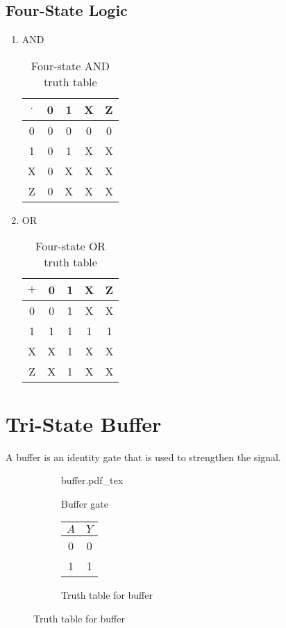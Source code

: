 \documentclass[oneside]{book}
\newcommand{\incfig}[1]{%
    {#1.pdf_tex}
}
\begin{document}
\subsection{Four-State Logic}
\begin{enumerate}
	\item AND
	      \begin{table}[ht]
		      \centering
		      \begin{tabular}{|c|cccc|}
			      \hline
			      $\cdot$ & 0 & 1 & X & Z \\
			      \hline
			      0       & 0 & 0 & 0 & 0 \\
			      1       & 0 & 1 & X & X \\
			      X       & 0 & X & X & X \\
			      Z       & 0 & X & X & X \\
			      \hline
		      \end{tabular}
		      \caption{Four-state AND truth table}
	      \end{table}
	\item OR
	      \begin{table}[ht]
		      \centering
		      \begin{tabular}{|c|cccc|}
			      \hline
			      $+$ & 0 & 1 & X & Z \\
			      \hline
			      0   & 0 & 1 & X & X \\
			      1   & 1 & 1 & 1 & 1 \\
			      X   & X & 1 & X & X \\
			      Z   & X & 1 & X & X \\
			      \hline
		      \end{tabular}
		      \caption{Four-state OR truth table}
	      \end{table}
\end{enumerate}

\section{Tri-State Buffer}
A buffer is an identity gate that is used to strengthen the signal.
\begin{figure}[H]
	\centering
	\begin{subfigure}{0.45\linewidth}
		\centering
		\incfig{buffer}
		\caption{Buffer gate}
	\end{subfigure}
	\begin{subfigure}{0.45\linewidth}
		\centering
		\begin{tabular}{|c|c|}
			\hline
			$A$ & $Y$ \\
			\hline
			0   & 0   \\
			1   & 1   \\
			\hline
		\end{tabular}
		\caption{Truth table for buffer}
	\end{subfigure}
\end{figure}
\end{document}
